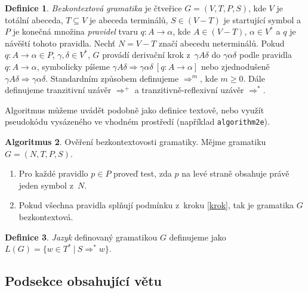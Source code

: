 \documentclass[11pt,a4paper,twocolumn]{article}
\begin{document}
\theoremstyle{definition}
\newtheorem{definice}{Definice}[section]

\begin{definice} \label{definice1.1}  \emph{Bezkontextová gramatika} je čtveřice $G=(V,T,P,S)$, kde $V$ je totální abeceda, $T \subseteq V$ je abeceda terminálů, $S \in (V-T)$ je startující symbol a $P$ je konečná množina \emph{pravidel} tvaru $q \colon A \rightarrow \alpha$, kde $A \in (V - T) $, $\alpha \in V^*$ a $q$ je návěští tohoto pravidla. Nechť $N = V - T$ značí abecedu neterminálů.
Pokud $q \colon A \rightarrow \alpha \in P$, $\gamma, \delta \in V^*$, $G$ provádí derivační krok z~$\gamma A \delta$ do $\gamma \alpha \delta$ podle pravidla $q\colon A \rightarrow \alpha$, symbolicky píšeme $\gamma A \delta \Rightarrow \gamma \alpha \delta\ [q\colon A \rightarrow \alpha]$ nebo zjednodušeně $\gamma A \delta \Rightarrow \gamma \alpha \delta$. Standardním způsobem definujeme $\Rightarrow^m$, kde $m \geq 0 $. Dále definujeme tranzitivní uzávěr $\Rightarrow^+$ a tranzitivně-reflexivní uzávěr $\Rightarrow^*$.
\end{definice}


Algoritmus můžeme uvádět podobně jako definice textově, nebo využít pseudokódu vysázeného ve vhodném prostředí (například \texttt{algorithm2e}).

\theoremstyle{definition}
\newtheorem{algoritmus}[definice]{Algoritmus}

\begin{algoritmus}  Ověření bezkontextovosti gramatiky. Mějme gramatiku $G = (N, T, P, S)$.
\begin{enumerate}
\item \label{krok} Pro každé pravidlo $p \in P$ proveď test, zda $p$ na levé straně obsahuje právě jeden symbol z~$N$.
\item Pokud všechna pravidla splňují podmínku z~kroku \ref{krok}, tak je gramatika $G$ bezkontextová.
\end{enumerate}
\end{algoritmus} 

\begin{definice}  \emph{Jazyk} definovaný gramatikou $G$ definujeme jako $L(G) = \{w \in T^*\ |\ S \Rightarrow^* w \}$.
\end{definice}

\subsection{Podsekce obsahující větu}
\end{document}

